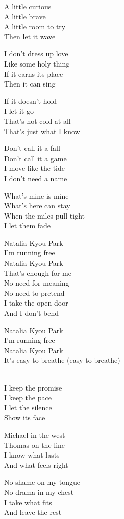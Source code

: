 \begin{lyrics}
A little curious\\
A little brave\\
A little room to try\\
Then let it wave

I don’t dress up love\\
Like some holy thing\\
If it earns its place\\
Then it can sing

If it doesn’t hold\\
I let it go\\
That’s not cold at all\\
That’s just what I know

Don’t call it a fall\\
Don’t call it a game\\
I move like the tide\\
I don’t need a name

What’s mine is mine\\
What’s here can stay\\
When the miles pull tight\\
I let them fade

Natalia Kyou Park\\
I’m running free\\
Natalia Kyou Park\\
That’s enough for me\\
No need for meaning\\
No need to pretend\\
I take the open door\\
And I don’t bend

Natalia Kyou Park\\
I’m running free\\
Natalia Kyou Park\\
It’s easy to breathe (easy to breathe)

\\
I keep the promise\\
I keep the pace\\
I let the silence\\
Show its face

Michael in the west\\
Thomas on the line\\
I know what lasts\\
And what feels right

No shame on my tongue\\
No drama in my chest\\
I take what fits\\
And leave the rest


\end{lyrics}
